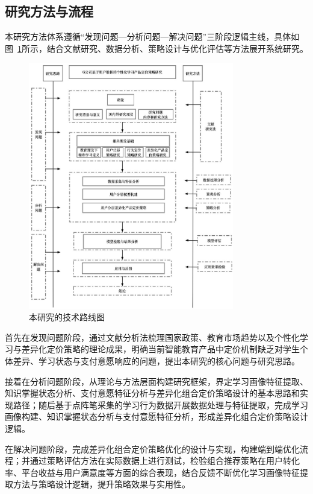 \subsection{研究方法与流程}

本研究方法体系遵循“发现问题—分析问题—解决问题”三阶段逻辑主线，具体如图~\ref{fig:tech_route}所示，结合文献研究、数据分析、策略设计与优化评估等方法展开系统研究。

\begin{figure}[htbp]
    \centering
    \includegraphics[width=0.8\textwidth]{figure/技术路线图.jpg}
    \caption{本研究的技术路线图}
    \label{fig:tech_route}
\end{figure}

首先在发现问题阶段，通过文献分析法梳理国家政策、教育市场趋势以及个性化学习与差异化定价策略的理论成果，明确当前智能教育产品中定价机制缺乏对学生个体差异、学习状态与支付意愿响应的问题，提出本研究的核心问题与研究思路。

接着在分析问题阶段，从理论与方法层面构建研究框架，界定学习画像特征提取、知识掌握状态分析、支付意愿特征分析与差异化组合定价策略设计的基本思路和实现路径；随后基于点阵笔采集的学习行为数据开展数据处理与特征提取，完成学习画像构建、知识掌握状态分析与支付意愿特征分析，形成差异化组合定价策略设计逻辑。

在解决问题阶段，完成差异化组合定价策略优化的设计与实现，构建端到端优化流程；并通过策略评估方法在实际数据上进行测试，检验组合推荐策略在用户转化率、平台收益与用户满意度等方面的综合表现，结合反馈不断优化学习画像特征提取方法与策略设计逻辑，提升策略效果与实用性。


